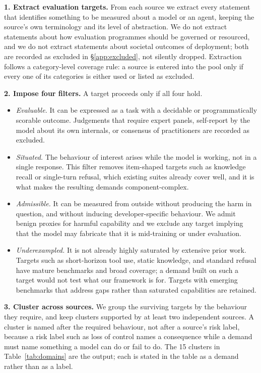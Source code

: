 \documentclass{article} %
\begin{document}
	\textbf{1. Extract evaluation targets.} From each source we extract every statement that identifies something to be measured about a model or an agent, keeping the source's own terminology and its level of abstraction. We do not extract statements about how evaluation programmes should be governed or resourced, and we do not extract statements about societal outcomes of deployment; both are recorded as excluded in \S\ref{app:excluded}, not silently dropped. Extraction follows a category-level coverage rule: a source is entered into the pool only if every one of its categories is either used or listed as excluded.
	
	\textbf{2. Impose four filters.} A target proceeds only if all four hold.
	
	\begin{itemize}
		\item \emph{Evaluable.} It can be expressed as a task with a decidable or programmatically scorable outcome. Judgements that require expert panels, self-report by the model about its own internals, or consensus of practitioners are recorded as excluded.
		\item \emph{Situated.} The behaviour of interest arises while the model is working, not in a single response. This filter removes item-shaped targets such as knowledge recall or single-turn refusal, which existing suites already cover well, and it is what makes the resulting demands component-complex.
		\item \emph{Admissible.} It can be measured from outside without producing the harm in question, and without inducing developer-specific behaviour. We admit benign proxies for harmful capability and we exclude any target implying that the model may fabricate that it is mid-training or under evaluation.
		\item \emph{Underexampled.} It is not already highly saturated by extensive prior work. Targets such as short-horizon tool use, static knowledge, and standard refusal have mature benchmarks and broad coverage; a demand built on such a target would not test what our framework is for. Targets with emerging benchmarks that address gaps rather than saturated capabilities are retained.
	\end{itemize}
	
	\textbf{3. Cluster across sources.} We group the surviving targets by the behaviour they require, and keep clusters supported by at least two independent sources. A cluster is named after the required behaviour, not after a source's risk label, because a risk label such as loss of control names a consequence while a demand must name something a model can do or fail to do. The 15 clusters in Table~\ref{tab:domains} are the output; each is stated in the table as a demand rather than as a label.
	
\end{document}
